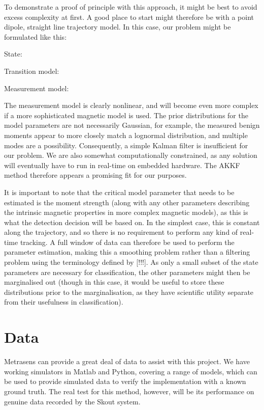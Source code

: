 \documentclass[10pt, a4paper, twocolumn]{article} %
\begin{document}
To demonstrate a proof of principle with this approach, it might be best to avoid excess complexity at first. A good place to start might therefore be with a point dipole, straight line trajectory model. In this case, our problem might be formulated like this:

State:

Transition model:

Measurement model:

The measurement model is clearly nonlinear, and will become even more complex if a more sophisticated magnetic model is used. The prior distributions for the model parameters are not necessarily Gaussian, for example, the measured benign moments appear to more closely match a lognormal distribution, and multiple modes are a possibility. Consequently, a simple Kalman filter is insufficient for our problem. We are also somewhat computationally constrained, as any solution will eventually have to run in real-time on embedded hardware. The AKKF method therefore appears a promising fit for our purposes.

It is important to note that the critical model parameter that needs to be estimated is the moment strength (along with any other parameters describing the intrinsic magnetic properties in more complex magnetic models), as this is what the detection decision will be based on. In the simplest case, this is constant along the trajectory, and so there is no requirement to perform any kind of real-time tracking. A full window of data can therefore be used to perform the parameter estimation, making this a smoothing problem rather than a filtering problem using the terminology defined by [!!!]. As only a small subset of the state parameters are necessary for classification, the other parameters might then be marginalised out (though in this case, it would be useful to store these distributions prior to the marginalisation, as they have scientific utility separate from their usefulness in classification).

\section{Data}

Metrasens can provide a great deal of data to assist with this project. We have working simulators in Matlab and Python, covering a range of models, which can be used to provide simulated data to verify the implementation with a known ground truth. The real test for this method, however, will be its performance on genuine data recorded by the Skout system.
\end{document}
